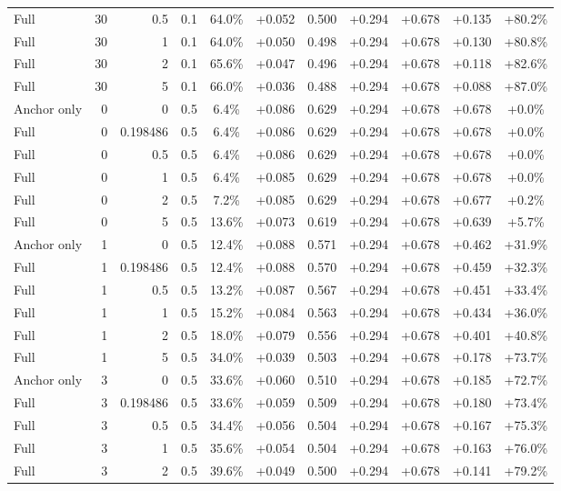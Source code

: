 \begin{table}[htbp]
\begin{tabular}{lrrrccccccc}
Full & 30 & 0.5 & 0.1 & 64.0\% & +0.052 & 0.500 & +0.294 & +0.678 & +0.135 & +80.2\% \\
Full & 30 & 1 & 0.1 & 64.0\% & +0.050 & 0.498 & +0.294 & +0.678 & +0.130 & +80.8\% \\
Full & 30 & 2 & 0.1 & 65.6\% & +0.047 & 0.496 & +0.294 & +0.678 & +0.118 & +82.6\% \\
Full & 30 & 5 & 0.1 & 66.0\% & +0.036 & 0.488 & +0.294 & +0.678 & +0.088 & +87.0\% \\
Anchor only & 0 & 0 & 0.5 & 6.4\% & +0.086 & 0.629 & +0.294 & +0.678 & +0.678 & +0.0\% \\
Full & 0 & 0.198486 & 0.5 & 6.4\% & +0.086 & 0.629 & +0.294 & +0.678 & +0.678 & +0.0\% \\
Full & 0 & 0.5 & 0.5 & 6.4\% & +0.086 & 0.629 & +0.294 & +0.678 & +0.678 & +0.0\% \\
Full & 0 & 1 & 0.5 & 6.4\% & +0.085 & 0.629 & +0.294 & +0.678 & +0.678 & +0.0\% \\
Full & 0 & 2 & 0.5 & 7.2\% & +0.085 & 0.629 & +0.294 & +0.678 & +0.677 & +0.2\% \\
Full & 0 & 5 & 0.5 & 13.6\% & +0.073 & 0.619 & +0.294 & +0.678 & +0.639 & +5.7\% \\
Anchor only & 1 & 0 & 0.5 & 12.4\% & +0.088 & 0.571 & +0.294 & +0.678 & +0.462 & +31.9\% \\
Full & 1 & 0.198486 & 0.5 & 12.4\% & +0.088 & 0.570 & +0.294 & +0.678 & +0.459 & +32.3\% \\
Full & 1 & 0.5 & 0.5 & 13.2\% & +0.087 & 0.567 & +0.294 & +0.678 & +0.451 & +33.4\% \\
Full & 1 & 1 & 0.5 & 15.2\% & +0.084 & 0.563 & +0.294 & +0.678 & +0.434 & +36.0\% \\
Full & 1 & 2 & 0.5 & 18.0\% & +0.079 & 0.556 & +0.294 & +0.678 & +0.401 & +40.8\% \\
Full & 1 & 5 & 0.5 & 34.0\% & +0.039 & 0.503 & +0.294 & +0.678 & +0.178 & +73.7\% \\
Anchor only & 3 & 0 & 0.5 & 33.6\% & +0.060 & 0.510 & +0.294 & +0.678 & +0.185 & +72.7\% \\
Full & 3 & 0.198486 & 0.5 & 33.6\% & +0.059 & 0.509 & +0.294 & +0.678 & +0.180 & +73.4\% \\
Full & 3 & 0.5 & 0.5 & 34.4\% & +0.056 & 0.504 & +0.294 & +0.678 & +0.167 & +75.3\% \\
Full & 3 & 1 & 0.5 & 35.6\% & +0.054 & 0.504 & +0.294 & +0.678 & +0.163 & +76.0\% \\
Full & 3 & 2 & 0.5 & 39.6\% & +0.049 & 0.500 & +0.294 & +0.678 & +0.141 & +79.2\% \\

\end{tabular}
\end{table}
